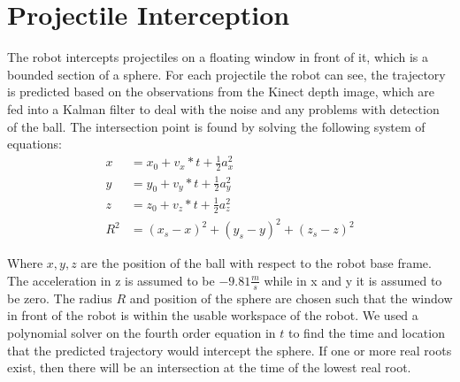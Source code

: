 \documentclass[12pt,a4paper,notitlepage]{report}
\begin{document}
\section*{Projectile Interception}
The robot intercepts projectiles on a floating window in front of it, which is
a bounded section of a sphere. For each projectile the robot can see, the trajectory is 
predicted based on the observations from the Kinect depth image, which are fed into a Kalman filter
to deal with the noise and any problems with detection of the ball. The intersection point is found by solving the following system of equations:
\begin{align*}
x &= x_0+v_x*t+\frac{1}{2}a_x^2\\
y &= y_0+v_y*t+\frac{1}{2}a_y^2\\
z &= z_0+v_z*t+\frac{1}{2}a_z^2\\
R^2 &= (x_s-x)^2+(y_s-y)^2+(z_s-z)^2
\end{align*}

Where \(x,y,z\) are the position of the ball with respect to the robot base frame.
The acceleration in z is assumed to be \(-9.81 \frac{m}{s}\) while in x and y it
 is assumed to be zero. The radius \(R\) and position of the sphere are chosen such that the window
 in front of the robot is within the usable workspace of the robot. We used a polynomial solver 
 on the fourth order equation in \(t\) to find the time and location
  that the predicted trajectory would intercept the sphere. If one or more real roots exist, then
  there will be an intersection at the time of the lowest real root.
  
\end{document}
